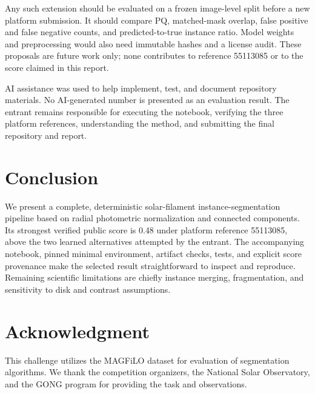 \documentclass[sigconf]{acmart}
\begin{document}
Any such extension should be evaluated on a frozen image-level split before a
new platform submission. It should compare PQ, matched-mask overlap, false
positive and false negative counts, and predicted-to-true instance ratio. Model
weights and preprocessing would also need immutable hashes and a license audit.
These proposals are future work only; none contributes to reference 55113085 or
to the score claimed in this report.

AI assistance was used to help implement, test, and document repository
materials. No AI-generated number is presented as an evaluation result. The
entrant remains responsible for executing the notebook, verifying the three
platform references, understanding the method, and submitting the final
repository and report.

\section{Conclusion}
We present a complete, deterministic solar-filament instance-segmentation
pipeline based on radial photometric normalization and connected components.
Its strongest verified public score is 0.48 under platform reference 55113085,
above the two learned alternatives attempted by the entrant. The accompanying
notebook, pinned minimal environment, artifact checks, tests, and explicit score
provenance make the selected result straightforward to inspect and reproduce.
Remaining scientific limitations are chiefly instance merging, fragmentation,
and sensitivity to disk and contrast assumptions.

\balance
\section{Acknowledgment}
This challenge utilizes the MAGFiLO dataset for evaluation of segmentation
algorithms. We thank the competition organizers, the National Solar
Observatory, and the GONG program for providing the task and observations.



\end{document}
